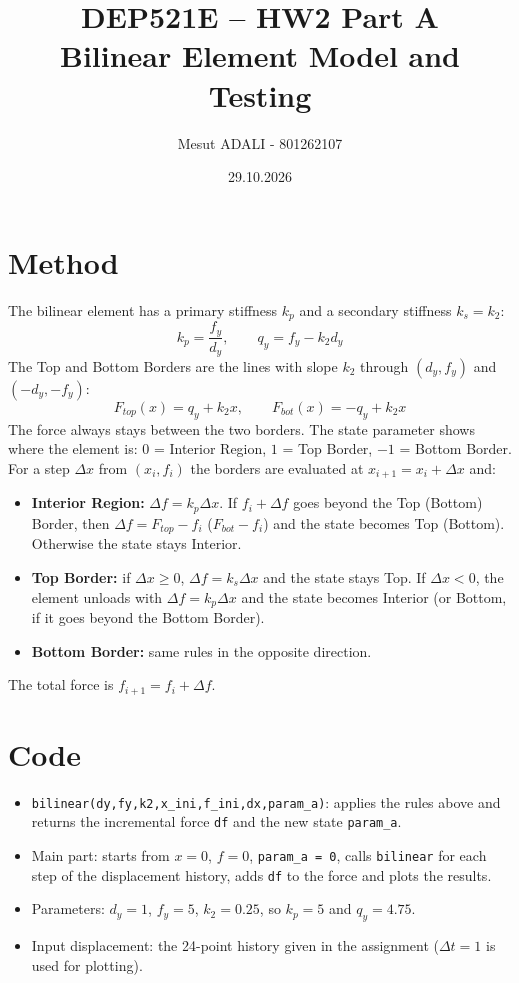 \documentclass[11pt,a4paper]{article}
\title{DEP521E -- HW2 Part A\\Bilinear Element Model and Testing}
\author{Mesut ADALI - 801262107}
\date{29.10.2026}
\begin{document}
\maketitle

\section{Method}
The bilinear element has a primary stiffness $k_p$ and a secondary stiffness $k_s = k_2$:
\[
k_p = \frac{f_y}{d_y}, \qquad q_y = f_y - k_2 d_y
\]
The Top and Bottom Borders are the lines with slope $k_2$ through $(d_y, f_y)$ and $(-d_y, -f_y)$:
\[
F_{top}(x) = q_y + k_2 x, \qquad F_{bot}(x) = -q_y + k_2 x
\]
The force always stays between the two borders. The state parameter shows where the
element is: $0$ = Interior Region, $1$ = Top Border, $-1$ = Bottom Border.
For a step $\Delta x$ from $(x_i, f_i)$ the borders are evaluated at $x_{i+1} = x_i + \Delta x$ and:
\begin{itemize}
  \item \textbf{Interior Region:} $\Delta f = k_p\Delta x$. If $f_i + \Delta f$ goes beyond the Top
        (Bottom) Border, then $\Delta f = F_{top} - f_i$ ($F_{bot} - f_i$) and the state becomes Top (Bottom).
        Otherwise the state stays Interior.
  \item \textbf{Top Border:} if $\Delta x \ge 0$, $\Delta f = k_s\Delta x$ and the state stays Top.
        If $\Delta x < 0$, the element unloads with $\Delta f = k_p\Delta x$ and the state becomes Interior
        (or Bottom, if it goes beyond the Bottom Border).
  \item \textbf{Bottom Border:} same rules in the opposite direction.
\end{itemize}
The total force is $f_{i+1} = f_i + \Delta f$.

\section{Code}
\begin{itemize}
  \item \texttt{bilinear(dy,fy,k2,x\_ini,f\_ini,dx,param\_a)}: applies the rules above and returns
        the incremental force \texttt{df} and the new state \texttt{param\_a}.
  \item Main part: starts from $x = 0$, $f = 0$, \texttt{param\_a = 0}, calls \texttt{bilinear}
        for each step of the displacement history, adds \texttt{df} to the force and plots the results.
  \item Parameters: $d_y = 1$, $f_y = 5$, $k_2 = 0.25$, so $k_p = 5$ and $q_y = 4.75$.
  \item Input displacement: the 24-point history given in the assignment ($\Delta t = 1$ is used for plotting).
\end{itemize}
\end{document}
